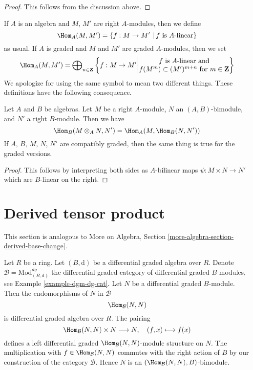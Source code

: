 \begin{proof}
This follows from the discussion above.
\end{proof}

\noindent
If $A$ is an algebra and $M$, $M'$ are right $A$-modules, then we
define
$$
\Hom_A(M, M') = \{f : M \to M'\mid f \text{ is }A\text{-linear}\}
$$
as usual. If $A$ is graded and $M$ and $M'$ are graded $A$-modules,
then we set
$$
\Hom_A(M, M') =
\bigoplus\nolimits_{n \in \mathbf{Z}}
\left\{
f : M \to M'
\middle|
\begin{matrix}
f \text{ is }A\text{-linear and}\\
f(M^m) \subset (M')^{m + n}\text{ for }m \in \mathbf{Z}
\end{matrix}
\right\}
$$
We apologize for using the same symbol to mean two different things.
These definitions have the following consequence.

\begin{lemma}
\label{lemma-tensor-hom-adjunction}
Let $A$ and $B$ be algebras. Let $M$ be a right $A$-module, $N$ an
$(A, B)$-bimodule, and $N'$ a right $B$-module. Then we have
$$
\Hom_B(M \otimes_A N, N') = \Hom_A(M, \Hom_B(N, N'))
$$
If $A$, $B$, $M$, $N$, $N'$ are compatibly graded, then the same thing
is true for the graded versions.
\end{lemma}

\begin{proof}
This follows by interpreting both sides as $A$-bilinear maps
$\psi : M \times N \to N'$ which are $B$-linear on the right.
\end{proof}





\section{Derived tensor product}
\label{section-base-change}

\noindent
This section is analogous to More on Algebra, Section
\ref{more-algebra-section-derived-base-change}.

\medskip\noindent
Let $R$ be a ring. Let $(B, \text{d})$ be a differential graded algebra
over $R$. Denote $\mathcal{B} = \text{Mod}^{dg}_{(B, \text{d})}$
the differential graded category of differential graded $B$-modules, see
Example \ref{example-dgm-dg-cat}. Let $N$ be a differential graded $B$-module.
Then the endomorphisms of $N$ in $\mathcal{B}$
$$
\Hom_\mathcal{B}(N, N)
$$
is differential graded algebra over $R$. The pairing
$$
\Hom_\mathcal{B}(N, N) \times N \longrightarrow N,\quad
(f, x) \longmapsto f(x)
$$
defines a left differential graded $\Hom_\mathcal{B}(N, N)$-module
structure on $N$. The multiplication with $f \in \Hom_\mathcal{B}(N, N)$
commutes with the right action of $B$ by our
construction of the category $\mathcal{B}$. Hence $N$ is an
$(\Hom_\mathcal{B}(N, N), B)$-bimodule.

